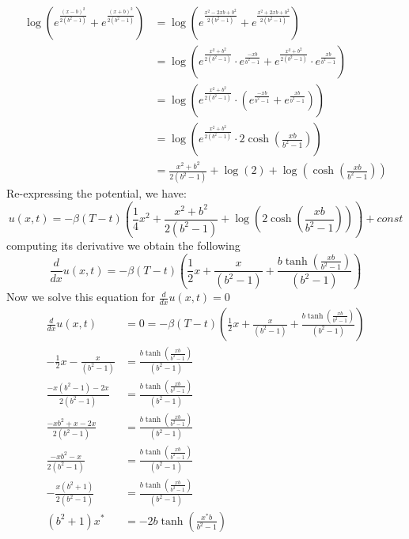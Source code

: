 \begin{align}
    \log{\left(e^{\frac{(x - b)^2}{2 (b^2 - 1)}} + e^{\frac{(x + b)^2}{2 (b^2-1)}} \right)} &=  \log{\left(e^{\frac{x^2 - 2xb+ b^2}{2 (b^2 - 1)}} + e^{\frac{x^2 + 2xb+b^2}{2 (b^2-1)}} \right)}\nonumber\\
    &=  \log{\left(e^{\frac{x^2 + b^2}{2 (b^2 - 1)}} \cdot e^{\frac{- xb}{b^2 - 1}}+ e^{\frac{x^2 +b^2}{2 (b^2-1)}} \cdot e^{\frac{xb}{b^2-1}}\right)}\nonumber\\
    &=  \log{\left(e^{\frac{x^2 + b^2}{2 (b^2 - 1)}} \cdot \left(e^{\frac{- xb}{b^2 - 1}}+  e^{\frac{xb}{b^2-1}}\right)\right)}\nonumber\\
    &=  \log{\left(e^{\frac{x^2 + b^2}{2 (b^2 - 1)}} \cdot 2\cosh(\frac{xb}{b^2-1}) \right)}\nonumber\\
    &=  \frac{x^2 + b^2}{2 (b^2 - 1)} + \log(2) + \log\left(\cosh(\frac{xb}{b^2-1}) \right)
\end{align}
Re-expressing the potential, we have:
\begin{equation}
    u(x, t) = -\beta(T - t) \left( \frac{1}{4} x^2 +   \frac{x^2 + b^2}{2 (b^2 - 1)} + \log\left(2\cosh(\frac{xb}{b^2-1}) \right) \right) + const
\end{equation}
computing its derivative we obtain the following
\begin{equation}
    \frac{d}{dx}u(x, t) =  -\beta(T- t) \left( \frac{1}{2} x +  \frac{x}{(b^2 - 1)} + \frac{b\tanh(\frac{xb}{b^2-1})}{(b^2 - 1)} \right)
\end{equation}
 Now we solve this equation for $\frac{d}{dx}u(x, t)=0$
 \begin{align}
 \frac{d}{dx}u(x, t) &= 0 = -\beta(T- t) \left( \frac{1}{2} x +  \frac{x}{(b^2 - 1)} + \frac{b\tanh(\frac{xb}{b^2-1})}{(b^2 - 1)} \right) \nonumber\\
    -\frac{1}{2} x -\frac{x}{(b^2 - 1)} &= \frac{b\tanh(\frac{xb}{b^2-1})}{(b^2 - 1)} \nonumber\\
        \frac{-x(b^2 - 1) - 2x}{2(b^2 - 1)} &= \frac{b\tanh(\frac{xb}{b^2-1})}{(b^2 - 1)} \nonumber\\
         \frac{-xb^2 +x - 2x}{2(b^2 - 1)} &= \frac{b\tanh(\frac{xb}{b^2-1})}{(b^2 - 1)} \nonumber\\
      \frac{-xb^2 - x}{2(b^2 - 1)} &= \frac{b\tanh(\frac{xb}{b^2-1})}{(b^2 - 1)} \nonumber\\
    -\frac{x(b^2 + 1)}{2(b^2 - 1)} &= \frac{b\tanh(\frac{xb}{b^2-1})}{(b^2 - 1)} \nonumber\\
     (b^2 + 1)x^{*} &= -2b\tanh(\frac{x^{*}b}{b^2-1})
 \end{align}




